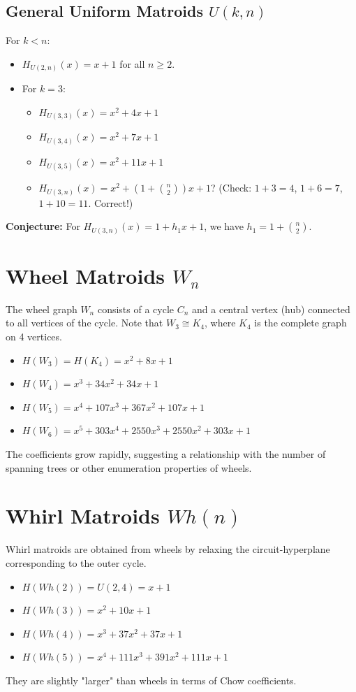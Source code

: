 \documentclass{article}
\begin{document}
\subsection{General Uniform Matroids $U(k, n)$}
For $k < n$:
\begin{itemize}
    \item $H_{U(2,n)}(x) = x + 1$ for all $n \geq 2$.
    \item For $k=3$:
    \begin{itemize}
        \item $H_{U(3,3)}(x) = x^2 + 4x + 1$
        \item $H_{U(3,4)}(x) = x^2 + 7x + 1$
        \item $H_{U(3,5)}(x) = x^2 + 11x + 1$
        \item $H_{U(3,n)}(x) = x^2 + (1 + \binom{n}{2})x + 1$? (Check: $1 + 3 = 4$, $1 + 6 = 7$, $1 + 10 = 11$. Correct!)
    \end{itemize}
\end{itemize}
\textbf{Conjecture:} For $H_{U(3,n)}(x) = 1 + h_1 x + 1$, we have $h_1 = 1 + \binom{n}{2}$.

\section{Wheel Matroids $W_n$}
The wheel graph $W_n$ consists of a cycle $C_n$ and a central vertex (hub) connected to all vertices of the cycle.
Note that $W_3 \cong K_4$, where $K_4$ is the complete graph on 4 vertices.
\begin{itemize}
    \item $H(W_3) = H(K_4) = x^2 + 8x + 1$
    \item $H(W_4) = x^3 + 34x^2 + 34x + 1$
    \item $H(W_5) = x^4 + 107x^3 + 367x^2 + 107x + 1$
    \item $H(W_6) = x^5 + 303x^4 + 2550x^3 + 2550x^2 + 303x + 1$
\end{itemize}
The coefficients grow rapidly, suggesting a relationship with the number of spanning trees or other enumeration properties of wheels.

\section{Whirl Matroids $Wh(n)$}
Whirl matroids are obtained from wheels by relaxing the circuit-hyperplane corresponding to the outer cycle.
\begin{itemize}
    \item $H(Wh(2)) = U(2,4) = x + 1$
    \item $H(Wh(3)) = x^2 + 10x + 1$
    \item $H(Wh(4)) = x^3 + 37x^2 + 37x + 1$
    \item $H(Wh(5)) = x^4 + 111x^3 + 391x^2 + 111x + 1$
\end{itemize}
They are slightly "larger" than wheels in terms of Chow coefficients.
\end{document}
